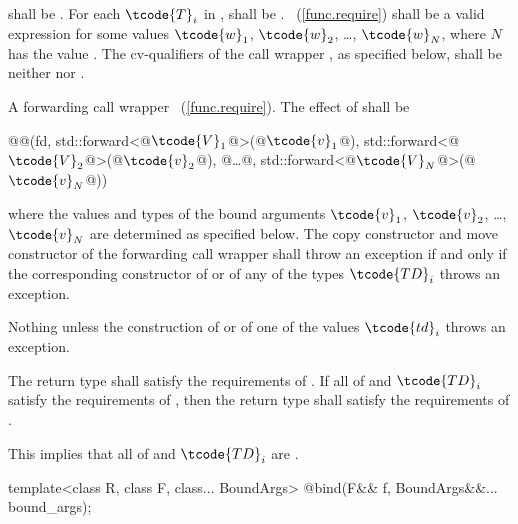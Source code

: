 \begin{itemdescr}
\pnum
\requires
{} shall be . For each $\tcode{T}_i$
in ,  shall be .
~(\ref{func.require}) shall be a valid expression for some
values $\tcode{w}_1$, $\tcode{w}_2$, \ldots, $\tcode{w}_N$, where
$N$ has the value .
The cv-qualifiers \cv{} of the call wrapper ,
as specified below, shall be neither  nor .

\pnum\returns
A forwarding call wrapper ~(\ref{func.require}).
The effect of  shall
be
\begin{codeblock}
@@(fd, std::forward<@$\tcode{V}_1$@>(@$\tcode{v}_1$@), std::forward<@$\tcode{V}_2$@>(@$\tcode{v}_2$@), @\ldots @, std::forward<@$\tcode{V}_N$@>(@$\tcode{v}_N$@))
\end{codeblock}
where the values and types of the bound
arguments $\tcode{v}_1$, $\tcode{v}_2$, \ldots, $\tcode{v}_N$ are determined as specified below.
The copy constructor and move constructor of the forwarding call wrapper shall throw an
exception if and only if the corresponding constructor of  or of any of the types
$\tcode{TD}_i$ throws an exception.

\pnum
\throws Nothing unless the construction of
 or of one of the values $\tcode{td}_i$ throws an exception.

\pnum
\remarks The return type shall satisfy the requirements of . If all
of  and $\tcode{TD}_i$ satisfy the requirements of , then the
return type shall satisfy the requirements of . \begin{note} This implies
that all of  and $\tcode{TD}_i$ are . \end{note}
\end{itemdescr}

%
\begin{itemdecl}
template<class R, class F, class... BoundArgs>
  @\unspec@ bind(F&& f, BoundArgs&&... bound_args);
\end{itemdecl}


